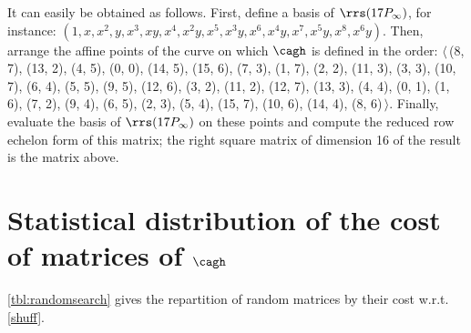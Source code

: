 It can easily be obtained as follows. First, define a basis of $\rrs(17P_\infty)$, for instance:
$(1, x, x^2, y, x^3, xy, x^4, x^2 y, x^5, x^3 y, x^6, x^4 y, x^7, x^5 y, x^8, x^6 y)$. Then, arrange the
affine points of the curve on which $\cagh$ is defined in the order:
$\langle$\,(8, 7), (13, 2), (4, 5), (0, 0), (14, 5), (15, 6), (7, 3), (1, 7), (2, 2), (11, 3), (3, 3), (10, 7), (6, 4),
(5, 5), (9, 5), (12, 6), (3, 2), (11, 2), (12, 7), (13, 3), (4, 4), (0, 1), (1, 6), (7, 2), (9, 4), (6, 5), (2, 3),
(5, 4), (15, 7), (10, 6), (14, 4), (8, 6)\,$\rangle$. Finally, evaluate the basis of $\rrs(17P_\infty)$ on these
points and compute the reduced row echelon form of this matrix;
the right square matrix of dimension 16 of the result is the matrix above.

\FloatBarrier

\section{Statistical distribution of the cost of matrices of $\cagh$}
\label{app:stats}

\autoref{tbl:randomsearch} gives the repartition of random matrices by their cost w.r.t. \autoref{shuff}.


